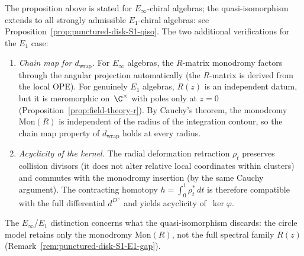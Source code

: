 \begin{remark}%
\label{rem:chain-D-vs-S1-E1}%
The proposition above is stated for $E_\infty$-chiral
algebras; the quasi-isomorphism extends to all
strongly admissible $E_1$-chiral algebras: see
Proposition~\ref{prop:punctured-disk-S1-qiso}. The two
additional verifications for the $E_1$ case:
\begin{enumerate}[label=\textup{(\roman*)}]
\item \emph{Chain map for $d_{\mathrm{wrap}}$.}
 For $E_\infty$ algebras, the $R$-matrix monodromy
 factors through the angular projection automatically
 (the $R$-matrix is derived from the local OPE).
 For genuinely $E_1$ algebras, $R(z)$ is an independent
 datum, but it is meromorphic on~$\C^\times$ with poles
 only at $z=0$
 (Proposition~\ref{prop:field-theory-r}).
 By Cauchy's theorem, the monodromy
 $\mathrm{Mon}(R)$ is independent of the radius of
 the integration contour, so the chain map property
 of $d_{\mathrm{wrap}}$ holds at every radius.
\item \emph{Acyclicity of the kernel.}
 The radial deformation retraction $\rho_t$ preserves
 collision divisors (it does not alter relative
 local coordinates within clusters) and commutes with
 the monodromy insertion (by the same Cauchy argument).
 The contracting homotopy $h=\int_0^1\rho_t^*\,dt$ is
 therefore compatible with the full differential
 $d^{D^\times}$ and yields acyclicity of~$\ker\varphi$.
\end{enumerate}
The $E_\infty$/$E_1$ distinction concerns what the quasi-isomorphism
discards: the circle model retains only the monodromy
$\mathrm{Mon}(R)$, not the full spectral family $R(z)$
(Remark~\ref{rem:punctured-disk-S1-E1-gap}).
\end{remark}

